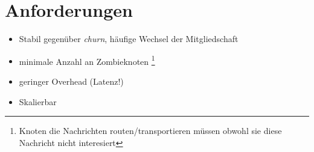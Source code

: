 \section{Anforderungen}
\begin{itemize}
\item Stabil gegenüber \emph{churn}, häufige Wechsel der Mitgliedschaft
\item minimale Anzahl an Zombieknoten \footnote{Knoten die Nachrichten routen/transportieren müssen obwohl sie diese Nachricht nicht interesiert}
\item geringer Overhead (Latenz!)
\item Skalierbar
\end{itemize}
